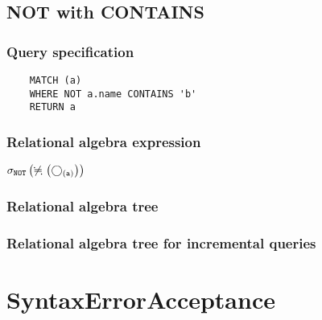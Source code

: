 	\subsection{NOT with CONTAINS}

	\subsubsection*{Query specification}

	\begin{lstlisting}
	MATCH (a)
	WHERE NOT a.name CONTAINS 'b'
	RETURN a
	\end{lstlisting}


	\subsubsection*{Relational algebra expression}

	$\selection{\mathtt{NOT}} \left(\alldifferent{} \left(\getvertices{a}{}\right)\right)$

	\subsubsection*{Relational algebra tree}


	\subsubsection*{Relational algebra tree for incremental queries}


	\section{SyntaxErrorAcceptance}


